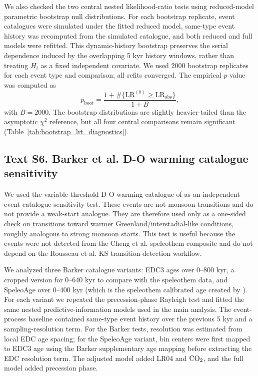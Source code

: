 \documentclass[11pt]{article}
\begin{document}
We also checked the two central nested likelihood-ratio tests using reduced-model parametric bootstrap null distributions. For each bootstrap replicate, event catalogues were simulated under the fitted reduced model, same-type event history was recomputed from the simulated catalogue, and both reduced and full models were refitted. This dynamic-history bootstrap preserves the serial dependence induced by the overlapping 5 kyr history windows, rather than treating \(H_i\) as a fixed independent covariate. We used 2000 bootstrap replicates for each event type and comparison; all refits converged. The empirical \(p\) value was computed as
\[
p_{\mathrm{boot}}=
\frac{1+\#\{\mathrm{LR}^{(b)}\geq \mathrm{LR}_{\mathrm{obs}}\}}
{1+B},
\]
with \(B=2000\). The bootstrap distributions are slightly heavier-tailed than the asymptotic \(\chi^2\) reference, but all four central comparisons remain significant (Table~\ref{tab:bootstrap_lrt_diagnostics}).

\subsection*{Text S6. Barker et al. D-O warming catalogue sensitivity}

We used the variable-threshold D-O warming catalogue of \citet{barker2011800} as an independent event-catalogue sensitivity test. These events are not monsoon transitions and do not provide a weak-start analogue. They are therefore used only as a one-sided check on transitions toward warmer Greenland/interstadial-like conditions, roughly analogous to strong monsoon starts. This test is useful because the events were not detected from the Cheng et al. speleothem composite and do not depend on the Rousseau et al. KS transition-detection workflow.

We analyzed three Barker catalogue variants: EDC3 ages over 0--800 kyr, a cropped version for 0--640 kyr to compare with the speleothem data, and SpeleoAge over 0--400 kyr (which is the speleothem calibrated age created by \citet{barker2011800}). For each variant we repeated the precession-phase Rayleigh test and fitted the same nested predictive-information models used in the main analysis. The event-process baseline contained same-type event history over the previous 5 kyr and a sampling-resolution term. For the Barker tests, resolution was estimated from local EDC age spacing; for the SpeleoAge variant, bin centers were first mapped to EDC3 age using the Barker supplementary age mapping before extracting the EDC resolution term. The adjusted model added LR04 and \(\ce{CO2}\), and the full model added precession phase.
\end{document}
